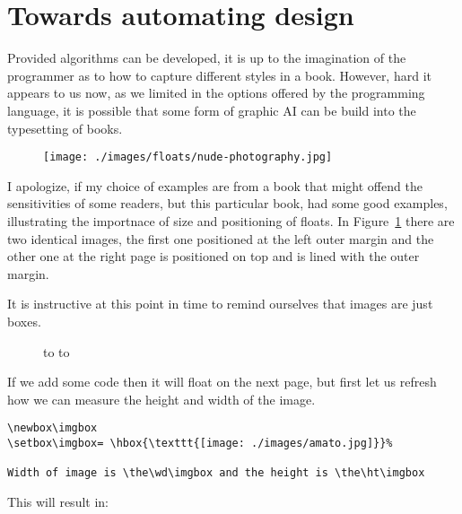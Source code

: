 \section{Towards automating design}

Provided algorithms can be developed, it is up to the imagination of the programmer as to how to capture different styles in a book. However, hard it appears to us now, as we limited in the options offered by the programming language, it is possible that some form of graphic AI can be build into the typesetting of books.

\begin{figure}[htbp]
\bgroup
\parindent=0pt
\texttt{[image: ./images/floats/nude-photography.jpg]}

\caption{}

\label{fig:nude01}
\egroup
\end{figure}

I apologize, if my choice of examples are from a book that might offend the sensitivities of some readers, but this particular book, had some good examples, illustrating the importnace of size and positioning of floats. In Figure~\ref{fig:nude01} there are two identical images, the first one positioned at the left outer margin and the other one at the right page is positioned on top and is lined with the outer margin.


\lipsum[1-5]

It is instructive at this point in time to remind ourselves that images are just boxes.
\begin{figure}[!b]
\expandafter\ifodd\thepage\relax
  \hbox to 
\else
  \hbox to 
\fi
\end{figure}

If we add some code then it will float on the next page, but first let us refresh how we can measure the height and width of the image.
\newbox\imgbox
\begin{scriptexample}{}{}
\begin{verbatim}
\newbox\imgbox
\setbox\imgbox= \hbox{\texttt{[image: ./images/amato.jpg]}}%

Width of image is \the\wd\imgbox and the height is \the\ht\imgbox
\end{verbatim}
\end{scriptexample}

This will result in:

